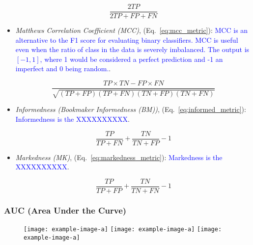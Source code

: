 \begin{itemize}[noitemsep,topsep=0pt]
\begin{equation}
{\frac{2TP}{2TP+FP+FN}}
\label{eq:f1_metric}
\end{equation}

\item \textit{Matthews Correlation Coefficient (MCC)}, (Eq.~\ref{eq:mcc_metric}): \textcolor{blue}{MCC is  an alternative to the F1 score for evaluating binary classifiers. MCC is useful even when the ratio of class in the data is severely imbalanced. The output is $[-1,1]$, where 1 would be considered a perfect prediction and -1 an imperfect and 0 being random.}.

\begin{equation}
{\frac{TP \times TN - FP \times FN}{\sqrt{(TP + FP)(TP + FN)(TN + FP)(TN + FN)}}}
\label{eq:mcc_metric}
\end{equation}

\item \textit{Informedness (Bookmaker Informedness (BM))}, (Eq.~\ref{eq:informed_metric}): \textcolor{blue}{Informedness is the XXXXXXXXXX}.

\begin{equation}
{\frac{TP}{TP+FN}+\frac{TN}{TN+FP}-1}
\label{eq:informed_metric}
\end{equation}

\item \textit{Markedness (MK)}, (Eq.~\ref{eq:markedness_metric}): \textcolor{blue}{Markedness is the XXXXXXXXXX}.

\begin{equation}
{\frac{TP}{TP+FP}+\frac{TN}{TN+FN}-1}
\label{eq:markedness_metric}
\end{equation}


\end{itemize}

\subsubsection{AUC (Area Under the Curve)}



\begin{figure}[htp]
	\centering
	\texttt{[image: example-image-a]}\hfil
	\texttt{[image: example-image-a]}\hfil
	\texttt{[image: example-image-a]}\hfil
	\caption{}
	\label{fig:auc_dist}
\end{figure}

